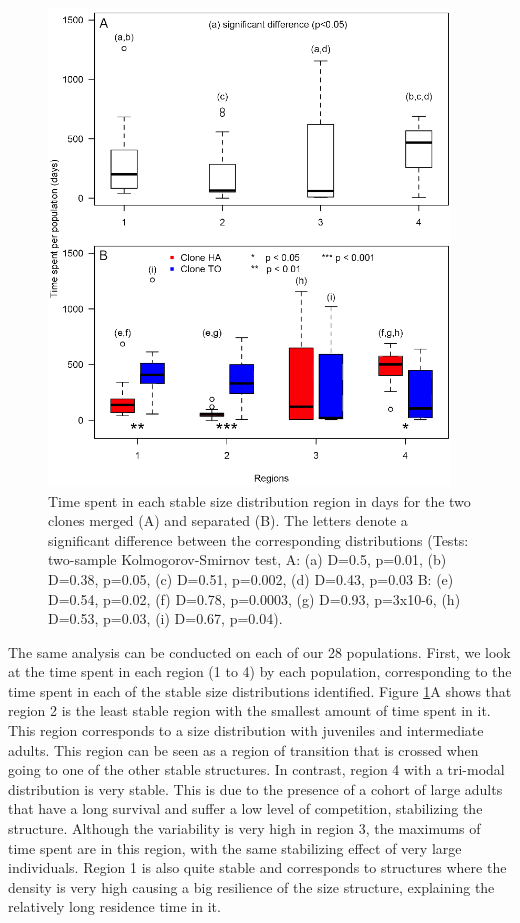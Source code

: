 \begin{figure}[!ht]
\begin{center}
\includegraphics[width=0.95\textwidth]{3-1_ChapExp1/Fig/AnnSP7}
\caption[Time spent in each stable size
distribution region]{Time spent in each stable size distribution region in days
for the two clones merged (A) and separated (B). The letters denote a
significant difference between the corresponding distributions (Tests:
two-sample Kolmogorov-Smirnov test, A: (a) D=0.5, p=0.01, (b) D=0.38, p=0.05,
(c) D=0.51, p=0.002, (d) D=0.43, p=0.03 B: (e) D=0.54, p=0.02, (f) D=0.78,
p=0.0003, (g) D=0.93, p=3x10-6, (h) D=0.53, p=0.03, (i) D=0.67, p=0.04).}
\label{fig:AnSP7}
\end{center}
\end{figure}

The same analysis can be conducted on each of our 28 populations. First, we look
at the time spent in each region (1 to 4) by each population, corresponding to
the time spent in each of the stable size distributions identified. Figure
\ref{fig:AnSP7}A shows that region 2 is the least stable region with the
smallest amount of time spent in it. This region corresponds to a size distribution with juveniles and
intermediate adults. This region can be seen as a region of transition that is
crossed when going to one of the other stable structures. In contrast, region 4
with a tri-modal distribution is very stable. This is due to the presence of a
cohort of large adults that have a long survival and suffer a low level of
competition, stabilizing the structure. Although the variability is very high in
region 3, the maximums of time spent are in this region, with the same
stabilizing effect of very large individuals. Region 1 is also quite stable and
corresponds to structures where the density is very high causing a big
resilience of the size structure, explaining the relatively long residence time
in it.

